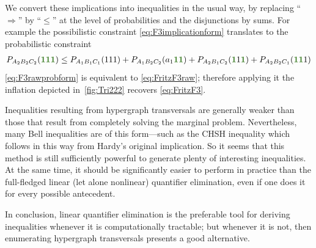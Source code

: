 We convert these implications into inequalities in the usual way, by replacing ``$\Rightarrow$'' by ``$\leq$'' at the level of probabilities and the disjunctions by sums. For example the possibilistic constraint \cref{eq:F3implicationform} translates to the probabilistic constraint
\begin{align}\label{eq:F3rawprobform}
    P_{A_2 B_2 C_2}\parens{\mgreen{1} \mgreen{1} \mgreen{1}} \leq P_{A_1 B_1 C_1}\parens{1 1 1}+P_{A_1 B_2 C_2}\parens{a_1 \mgreen{1 1}}+P_{A_2 B_1 C_2}\parens{\mgreen{1} 1 \mgreen{1}}+P_{A_2 B_2 C_1}\parens{\mgreen{1 1} 1}
\end{align}
\cref{eq:F3rawprobform} is equivalent to \cref{eq:FritzF3raw}; therefore applying it the inflation depicted in~\cref{fig:Tri222} recovers \cref{eq:FritzF3}.

Inequalities resulting from hypergraph transversals are generally weaker than those that result from completely solving the marginal problem. Nevertheless, many Bell inequalities are of this form---such as the CHSH inequality which follows in this way from Hardy's original implication. So it seems that this method is still sufficiently powerful to generate plenty of interesting inequalities. At the same time, it should be significantly easier to perform in practice than the full-fledged linear (let alone nonlinear) quantifier elimination, even if one does it for every possible antecedent.

In conclusion, linear quantifier elimination is the preferable tool for deriving inequalities whenever it is computationally tractable; but whenever it is not, then enumerating hypergraph transversals presents a good alternative. %


